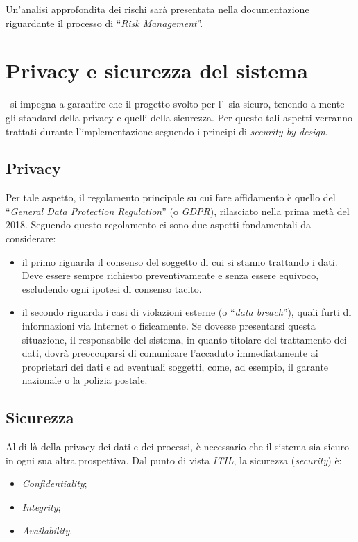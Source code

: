 	Un'analisi approfondita dei rischi sarà presentata nella documentazione riguardante il processo di ``\textit{Risk Management}''.

\newpage
\section{Privacy e sicurezza del sistema}

	\azienda~si impegna a garantire che il progetto svolto per l'\istituto~sia sicuro, tenendo a mente gli standard della privacy e quelli della sicurezza.
	Per questo tali aspetti verranno trattati durante l'implementazione seguendo i principi di \textit{security by design}.

	\subsection{Privacy}
		
		Per tale aspetto, il regolamento principale su cui fare affidamento è quello del 
		``\textit{General Data Protection Regulation}'' (o \textit{GDPR}), rilasciato nella prima metà del 2018.
		Seguendo questo regolamento ci sono due aspetti fondamentali da considerare:
		\begin{itemize}
			
			\item il primo riguarda il consenso del soggetto di cui si stanno trattando i dati. 
			Deve essere sempre richiesto preventivamente e senza essere equivoco, escludendo ogni ipotesi di consenso tacito.
			
			\item il secondo riguarda i casi di violazioni esterne (o ``\textit{data breach}''), quali furti di informazioni via Internet o fisicamente.
			Se dovesse presentarsi questa situazione, il responsabile del sistema, in quanto titolare del trattamento dei dati, dovrà preoccuparsi di comunicare l'accaduto immediatamente ai proprietari dei dati e ad eventuali soggetti, come, ad esempio, il garante nazionale o la polizia postale.
			
		\end{itemize}
		
	\subsection{Sicurezza}
	
		Al di là della privacy dei dati e dei processi, è necessario che il sistema sia sicuro in ogni sua altra prospettiva.
		Dal punto di vista \textit{ITIL}, la sicurezza (\textit{security}) è:
		\begin{itemize}[noitemsep]
			\item \textit{Confidentiality};
			\item \textit{Integrity};
			\item \textit{Availability}.
		\end{itemize}
	
